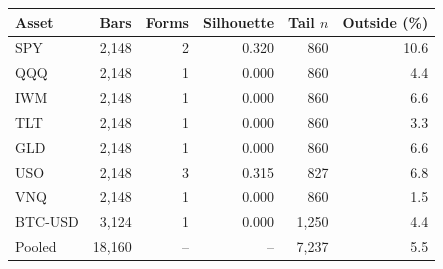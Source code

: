 \begin{tabular}{lrrrrr}
\toprule
Asset & Bars & Forms & Silhouette & Tail $n$ & Outside (\%) \\
\midrule
SPY & 2,148 & 2 & 0.320 & 860 & 10.6 \\
QQQ & 2,148 & 1 & 0.000 & 860 & 4.4 \\
IWM & 2,148 & 1 & 0.000 & 860 & 6.6 \\
TLT & 2,148 & 1 & 0.000 & 860 & 3.3 \\
GLD & 2,148 & 1 & 0.000 & 860 & 6.6 \\
USO & 2,148 & 3 & 0.315 & 827 & 6.8 \\
VNQ & 2,148 & 1 & 0.000 & 860 & 1.5 \\
BTC-USD & 3,124 & 1 & 0.000 & 1,250 & 4.4 \\
\midrule
Pooled & 18,160 & -- & -- & 7,237 & 5.5 \\
\bottomrule
\end{tabular}
